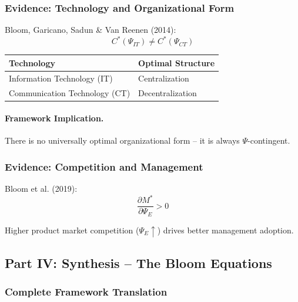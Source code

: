 \subsubsection{Evidence: Technology and Organizational Form}

Bloom, Garicano, Sadun \& Van Reenen (2014):
\begin{equation}
C^*(\Psi_{IT}) \neq C^*(\Psi_{CT})
\end{equation}

\begin{center}
\begin{tabular}{ll}
\hline
\textbf{Technology} & \textbf{Optimal Structure} \\
\hline
Information Technology (IT) & Centralization \\
Communication Technology (CT) & Decentralization \\
\hline
\end{tabular}
\end{center}

\paragraph{Framework Implication.}
There is no universally optimal organizational form – it is always $\Psi$-contingent.

\subsubsection{Evidence: Competition and Management}

Bloom et al. (2019):
\begin{equation}
\frac{\partial M^*}{\partial \Psi_E} > 0
\end{equation}

Higher product market competition ($\Psi_E \uparrow$) drives better management adoption.

\subsection{Part IV: Synthesis – The Bloom Equations}

\subsubsection{Complete Framework Translation}

